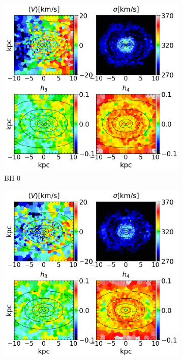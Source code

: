 \documentclass[english, oneside]{HYgradu}
\begin{document}
\begin{figure}
	\centering
	\begin{subfigure}[b]{0.49\textwidth}
		\includegraphics[width=\textwidth]{BH_0.png}
		\caption{BH-0}
	\end{subfigure}
	\begin{subfigure}[b]{0.49\textwidth}
		\includegraphics[width=\textwidth]{BH_1.png}

\end{subfigure}
\end{figure}
\end{document}
